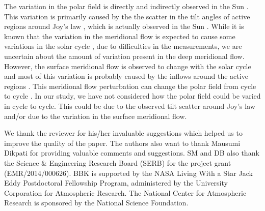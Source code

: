 \documentclass[preprint2,times,tighten]{aastex61}
\begin{document}
The variation in the polar field is directly and indirectly observed in the Sun \citep{Muno13,Priy14}. 
This variation is primarily caused by the the scatter in the tilt angles of active regions around Joy's law \citep{Ca13,JCS14,HCM17,KM17}, 
which is actually observed in the Sun \citep[e.g.,][]{Das10,SK12}. 
While it is known that the variation in the meridional flow is expected to cause some variations in the solar cycle \citep[e.g.,][]{KC11,BD13}, 
due to difficulties in the measurements, we are uncertain about the amount of variation present in the deep meridional flow. However, the surface meridional flow is observed to change with the solar cycle and most of this variation is probably caused by the inflows around the active regions \citep{Gizon10}. This meridional flow perturbation can change the polar field from cycle to cycle \citep{Jiang10,HU14,STD15}. 
In our study, we have not considered how the polar field could be varied in cycle to cycle. This could be due to the observed 
tilt scatter around Joy's law and/or due to the variation in the surface meridional flow.

\begin{acknowledgements}
{We thank the reviewer for his/her invaluable suggestions which helped us to improve the quality of the paper. The authors also want to thank Mausumi Dikpati for providing valuable comments and suggestions. 
 SM and DB also thank the Science
\& Engineering Research Board (SERB) for the project grant
(EMR/2014/000626).
BBK is supported by the NASA Living With a Star Jack Eddy Postdoctoral Fellowship Program, administered by the University Corporation for Atmospheric Research. The National Center for Atmospheric Research is sponsored by the National Science Foundation.}
\end{acknowledgements}


 
 
\end{document}
